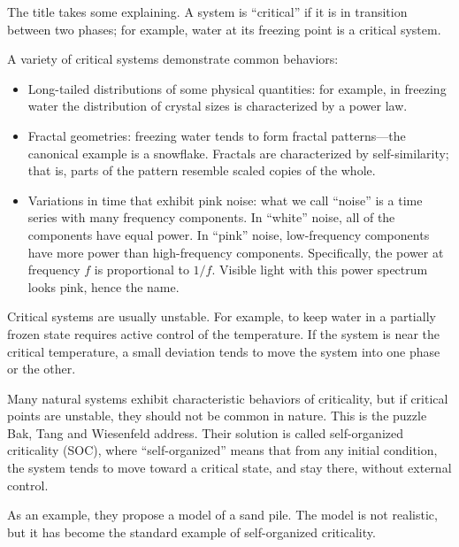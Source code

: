 \documentclass[10pt]{book}
\begin{document}
The title takes some explaining.  A system is ``critical'' if it is
in transition between two phases; for example, water at
its freezing point is a critical system.

A variety of critical systems demonstrate common behaviors:

\begin{itemize}

\item Long-tailed distributions of some physical quantities: for
  example, in freezing water the distribution of crystal sizes is
  characterized by a power law.

\item Fractal geometries: freezing water tends to form fractal
  patterns---the canonical example is a snowflake.  Fractals
  are characterized by self-similarity; that is, parts of the
  pattern resemble scaled copies of the whole.

\item Variations in time that exhibit pink noise: what we call
  ``noise'' is a time series with many frequency components.  In
  ``white'' noise, all of the components have equal power.  In
  ``pink'' noise, low-frequency components have more power than
  high-frequency components.  Specifically, the power at frequency $f$
  is proportional to $1/f$.  Visible light with this power spectrum
  looks pink, hence the name.

\end{itemize}

Critical systems are usually unstable.  For example, to keep
water in a partially frozen state requires active control of
the temperature.  If the system is near the critical
temperature, a small deviation tends to move the system
into one phase or the other.

Many natural systems exhibit characteristic behaviors of
criticality, but if critical points are unstable, they should
not be common in nature.  This is the puzzle Bak, Tang and
Wiesenfeld address.  Their solution is called self-organized
criticality (SOC), where ``self-organized'' means that from
any initial condition, the system tends to move toward a
critical state, and stay there, without external control.

As an example, they propose a model of a sand pile.  The model is not
realistic, but it has become the standard example of self-organized
criticality.
\end{document}
